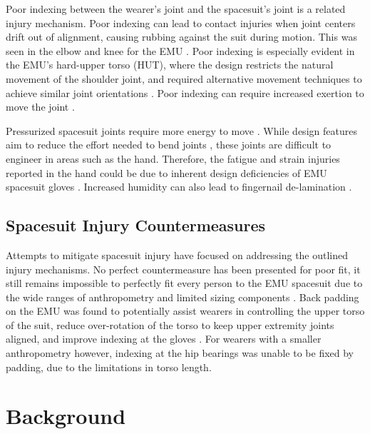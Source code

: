 \documentclass[defaultstyle,11pt]{comps}
\begin{document}
Poor indexing between the wearer's joint and the spacesuit's joint is a related injury mechanism.
Poor indexing can lead to contact injuries when joint centers drift out of alignment, causing rubbing against the suit during motion.
This was seen in the elbow and knee for the EMU \citep{Strauss2004}.
Poor indexing is especially evident in the EMU's hard-upper torso (HUT), where the design restricts the natural movement of the shoulder joint, and required alternative movement techniques to achieve similar joint orientations \citep{Williams2003, Strauss2004, Scheuring2012}.
Poor indexing can require increased exertion to move the joint \citep{Menendez1993}.

Pressurized spacesuit joints require more energy to move \citep{Amick2015}.
While design features aim to reduce the effort needed to bend joints \citep{Harris2001}, these joints are difficult to engineer in areas such as the hand.
Therefore, the fatigue and strain injuries reported in the hand could be due to inherent design deficiencies of EMU spacesuit gloves \citep{Strauss2004, Viegas2004}. Increased humidity can also lead to fingernail de-lamination \citep{Chappell2017}.

\hypertarget{spacesuit-injury-countermeasures}{%
\section{Spacesuit Injury Countermeasures}\label{spacesuit-injury-countermeasures}}

Attempts to mitigate spacesuit injury have focused on addressing the outlined injury mechanisms.
No perfect countermeasure has been presented for poor fit, it still remains impossible to perfectly fit every person to the EMU spacesuit due to the wide ranges of anthropometry and limited sizing components \citep{Benson2009}.
Back padding on the EMU was found to potentially assist wearers in controlling the upper torso of the suit, reduce over-rotation of the torso to keep upper extremity joints aligned, and improve indexing at the gloves \citep{Chappell2017}.
For wearers with a smaller anthropometry however, indexing at the hip bearings was unable to be fixed by padding, due to the limitations in torso length.

\hypertarget{background}{%
\chapter{Background}\label{background}}
\end{document}

